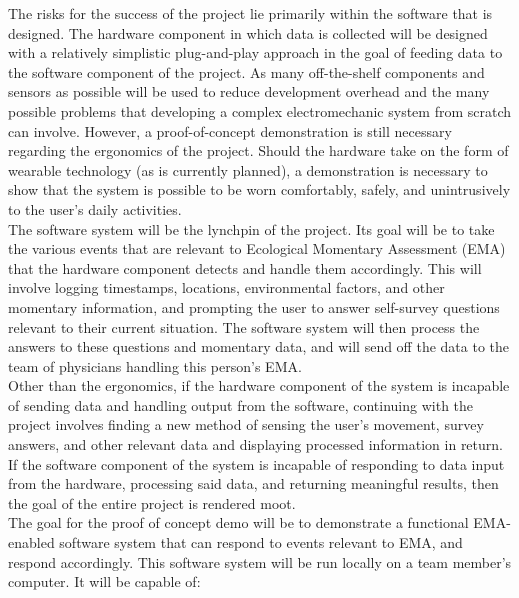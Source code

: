 \documentclass{article}
\begin{document}
The risks for the success of the project lie primarily within the software that is designed. The hardware component in which data is collected will be designed with a relatively simplistic plug-and-play approach in the goal of feeding data to the software component of the project. As many off-the-shelf components and sensors as possible will be used to reduce development overhead and the many possible problems that developing a complex electromechanic system from scratch can involve. However, a proof-of-concept demonstration is still necessary regarding the ergonomics of the project. Should the hardware take on the form of wearable technology (as is currently planned), a demonstration is necessary to show that the system is possible to be worn comfortably, safely, and unintrusively to the user's daily activities.\\

The software system will be the lynchpin of the project. Its goal will be to take the various events that are relevant to Ecological Momentary Assessment (EMA) that the hardware component detects and handle them accordingly. This will involve logging timestamps, locations, environmental factors, and other momentary information, and prompting the user to answer self-survey questions relevant to their current situation. The software system will then process the answers to these questions and momentary data, and will send off the data to the team of physicians handling this person's EMA.\\

Other than the ergonomics, if the hardware component of the system is incapable of sending data and handling output from the software, continuing with the project involves finding a new method of sensing the user's movement, survey answers, and other relevant data and displaying processed information in return. If the software component of the system is incapable of responding to data input from the hardware, processing said data, and returning meaningful results, then the goal of the entire project is rendered moot.\\

The goal for the proof of concept demo will be to demonstrate a functional EMA-enabled software system that can respond to events relevant to EMA, and respond accordingly. This software system will be run locally on a team member's computer. It will be capable of:\\
\end{document}
